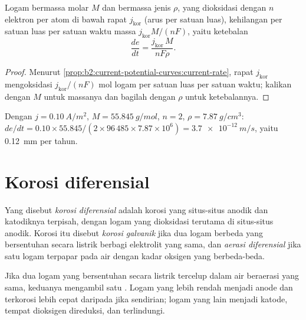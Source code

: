 \begin{proposition}\label{prop:b2:corrosion:rate}
Logam bermassa molar $M$ dan bermassa jenis $\rho$, yang dioksidasi dengan
$n$ elektron per atom di bawah rapat  $j_{\text{kor}}$ (arus
per satuan luas), kehilangan per satuan luas per satuan waktu massa
$j_{\text{kor}}M/(nF)$, yaitu ketebalan
\[
  \frac{de}{dt} = \frac{j_{\text{kor}}\,M}{nF\rho} .
\]
\end{proposition}

\begin{proof}
Menurut \cref{prop:b2:current-potential-curves:current-rate}, rapat  $j_{\text{kor}}$ mengoksidasi $j_{\text{kor}}/(nF)$ mol logam per
satuan luas per satuan waktu; kalikan dengan $M$ untuk massanya dan bagilah
dengan $\rho$ untuk ketebalannya.
\end{proof}

\begin{example}\label{ex:b2:corrosion:rate}
Dengan $j = \qty{0.10}{A/m^2}$, $M = \qty{55.845}{g/mol}$, $n = 2$, $\rho =
\qty{7.87}{g/cm^3}$: $de/dt = 0.10 \times 55.845/(2 \times 96\,485 \times 7.87
\times 10^6) = \qty{3.7e-12}{m/s}$, yaitu \qty{0.12}{mm} per tahun.
\end{example}

\section{Korosi diferensial}

\begin{definition}\label{def:b2:corrosion:differential}
Yang disebut \emph{korosi diferensial} adalah
korosi yang situs-situs anodik dan katodiknya terpisah, dengan logam yang
dioksidasi terutama di situs-situs anodik. Korosi itu disebut \emph{korosi
galvanik} jika dua logam berbeda yang bersentuhan
secara listrik berbagi elektrolit yang sama, dan \emph{aerasi
diferensial} jika satu logam terpapar pada air
dengan kadar oksigen yang berbeda-beda.
\end{definition}

\begin{proposition}\label{prop:b2:corrosion:galvanic}
Jika dua logam yang bersentuhan secara listrik tercelup dalam air beraerasi
yang sama, keduanya mengambil satu . Logam yang  lebih rendah menjadi anode dan terkorosi lebih cepat daripada jika
sendirian; logam yang lain menjadi katode, tempat dioksigen direduksi, dan
terlindungi.
\end{proposition}

